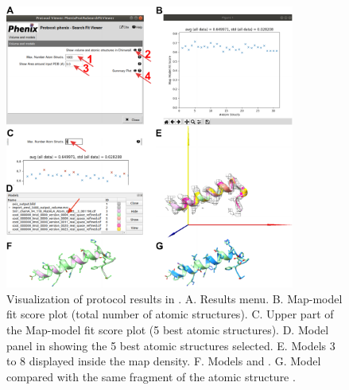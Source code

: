   
   \begin{figure}[H]
  \centering 
  \captionsetup{width=.9\linewidth} 
  \includegraphics[width=0.85\textwidth]{Images/Fig_search_fit_4.pdf}
  \caption{Visualization of  protocol results in \scipion. A. Results menu. B. Map-model fit score plot (total number of atomic structures). C. Upper part of the Map-model fit score plot (5 best atomic structures). D. Model panel in \chimera showing the 5 best  atomic structures selected. E. Models 3 to 8 displayed inside the map density. F. Models  and . G. Model  compared with the same fragment of the atomic structure .}
  \label{fig:phenix_search_fit_4}
  \end{figure}
  
